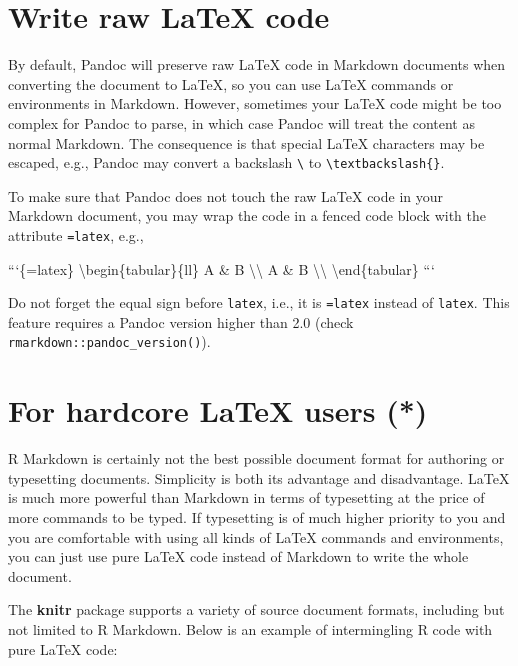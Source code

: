 \documentclass[
  11pt,
]{krantz}
\newenvironment{Shaded}{\begin{snugshade}}{\end{snugshade}}
\newcommand{\BaseNTok}[1]{\textcolor[rgb]{0.06,0.06,0.06}{#1}}
\begin{document}
\hypertarget{raw-latex}{%
\section{Write raw LaTeX code}\label{raw-latex}}

By default, Pandoc will preserve raw LaTeX code in Markdown documents when converting the document to LaTeX, so you can use LaTeX commands or environments in Markdown. However, sometimes your LaTeX code might be too complex for Pandoc to parse, in which case Pandoc will treat the content as normal Markdown. The consequence is that special LaTeX characters may be escaped, e.g., Pandoc may convert a backslash \texttt{\textbackslash{}} to \texttt{\textbackslash{}textbackslash\{\}}.

To make sure that Pandoc does not touch the raw LaTeX code in your Markdown document, you may wrap the code in a fenced code block with the attribute \texttt{=latex}, e.g.,

\begin{Shaded}
\begin{Highlighting}[]
\BaseNTok{```\{=latex\}}
\BaseNTok{\textbackslash{}begin\{tabular\}\{ll\}}
\BaseNTok{A & B \textbackslash{}\textbackslash{}}
\BaseNTok{A & B \textbackslash{}\textbackslash{}}
\BaseNTok{\textbackslash{}end\{tabular\}}
\BaseNTok{```}
\end{Highlighting}
\end{Shaded}

Do not forget the equal sign before \texttt{latex}, i.e., it is \texttt{=latex} instead of \texttt{latex}. This feature requires a Pandoc version higher than 2.0 (check \texttt{rmarkdown::pandoc\_version()}).

\hypertarget{latex-hardcore}{%
\section{For hardcore LaTeX users (*)}\label{latex-hardcore}}

R Markdown is certainly not the best possible document format for authoring or typesetting documents. Simplicity is both its advantage and disadvantage. LaTeX is much more powerful than Markdown in terms of typesetting at the price of more commands to be typed. If typesetting is of much higher priority to you and you are comfortable with using all kinds of LaTeX commands and environments, you can just use pure LaTeX code instead of Markdown to write the whole document.

The \textbf{knitr} package supports a variety of source document formats, including but not limited to R Markdown. Below is an example of intermingling R code with pure LaTeX code:
\end{document}
